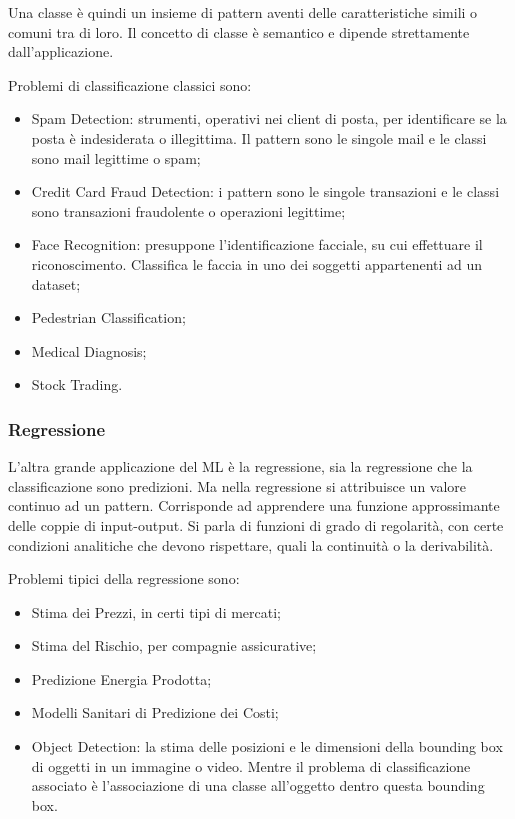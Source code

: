 \documentclass{article}
\numberwithin{equation}{subsection}
\begin{document}
Una classe è quindi un insieme di pattern aventi delle caratteristiche simili o comuni 
tra di loro. Il concetto di classe è semantico e dipende strettamente dall'applicazione. 

Problemi di classificazione classici sono:
\begin{itemize}
    \item Spam Detection: strumenti, operativi nei client di posta, per identificare se la posta è indesiderata o illegittima. Il pattern sono le singole mail e le classi sono mail legittime o spam;
    \item Credit Card Fraud Detection: i pattern sono le singole transazioni e le classi sono transazioni fraudolente o operazioni legittime;
    \item Face Recognition: presuppone l'identificazione facciale, su cui effettuare il riconoscimento. Classifica le faccia in uno dei soggetti appartenenti ad un dataset;
    \item Pedestrian Classification;
    \item Medical Diagnosis;
    \item Stock Trading. 
\end{itemize}

\subsubsection{Regressione}

L'altra grande applicazione del ML è la regressione, sia la regressione che la classificazione sono predizioni. Ma nella regressione si attribuisce un valore continuo ad un pattern. Corrisponde ad apprendere una funzione approssimante delle coppie di input-output. Si parla di funzioni di grado di regolarità, con certe condizioni analitiche che devono rispettare, quali la continuità o la derivabilità. 

Problemi tipici della regressione sono:
\begin{itemize}
    \item Stima dei Prezzi, in certi tipi di mercati;
    \item Stima del Rischio, per compagnie assicurative;
    \item Predizione Energia Prodotta;
    \item Modelli Sanitari di Predizione dei Costi;
    \item Object Detection: la stima delle posizioni e le dimensioni della bounding box di oggetti in un immagine o video. Mentre il problema di classificazione associato è l'associazione di una classe all'oggetto dentro questa bounding box.
\end{itemize}
\end{document}
